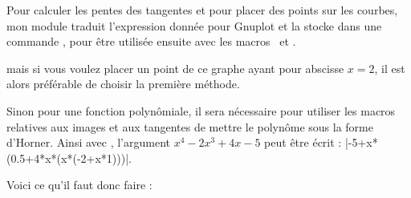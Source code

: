  Pour calculer les pentes des tangentes et pour placer des points sur les courbes, mon module traduit l'expression donnée pour Gnuplot et la stocke dans une commande , pour être utilisée ensuite avec les macros \ et .
%

mais si vous voulez placer un point de ce graphe ayant pour abscisse $x=2$, il est alors préférable de choisir la première méthode.

Sinon pour une fonction polynômiale, il sera nécessaire pour utiliser les macros relatives aux images et aux tangentes de mettre le polynôme sous la forme d'Horner.
Ainsi avec , l'argument $x^4-2x^3+4x-5$ peut être écrit : |-5+x*(0.5+4*x*(x*(-2+x*1)))|.

Voici ce qu'il faut donc faire :

\begin{center}
\begin{tkzexample}[]
\end{tkzexample}
\end{center}

\endinput
